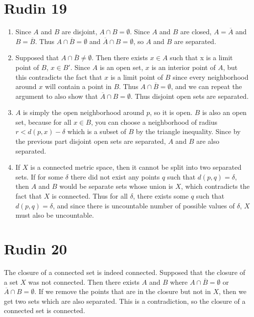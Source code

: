 \documentclass{article}
\begin{document}
\newpage

\section*{Rudin 19}
\begin{enumerate}
	\item Since $A$ and $B$ are disjoint, $A \cap B = \emptyset$.
	Since $A$ and $B$ are closed, $A = \overline{A}$ and $B = \overline{B}$.
	Thus $A \cap \overline{B} = \emptyset$ and $\overline{A} \cap B = \emptyset$,
	so $A$ and $B$ are separated.
	\item Supposed that $A \cap \overline{B} \neq \emptyset$.
	Then there exists $x \in A$ such that x is a limit point of $B$, $x \in B'$.
	Since $A$ is an open set, $x$ is an interior point of $A$,
	but this contradicts the fact that $x$ is a limit point of $B$
	since every neighborhood around $x$ will contain a point in $B$.
	Thus $A \cap \overline{B} = \emptyset$, and we can repeat
	the argument to also show that $\overline{A} \cap B = \emptyset$.
	Thus disjoint open sets are separated.
	\item $A$ is simply the open neighborhood around $p$, so it is open.
	$B$ is also an open set, because for all $x \in B$, you can choose 
	a neighborhood of radius $r < d(p,x) - \delta$ which is a subset of $B$
	by the triangle inequality.
	Since by the previous part disjoint open sets are separated,
	$A$ and $B$ are also separated.
	\item If $X$ is a connected metric space, then it cannot be split
	into two separated sets.
	If for some $\delta$ there did not exist any points $q$ such that 
	$d(p,q) = \delta$, then $A$ and $B$ would be separate sets whose union is $X$,
	which contradicts the fact that $X$ is connected.
	Thus for all $\delta$, there exists some $q$ such that $d(p,q) = \delta$,
	and since there is uncountable number of possible values of $\delta$,
	$X$ must also be uncountable.
\end{enumerate}
\newpage 

\section*{Rudin 20}
The closure of a connected set is indeed connected.
Supposed that the closure of a set $X$ was not connected.
Then there exists $A$ and $B$ where $A \cap \overline{B} = \emptyset$ or $\overline{A} \cap B = \emptyset$.
If we remove the points that are in the closure but not in $X$,
then we get two sets which are also separated.
This is a contradiction, so the closure of a connected set is connected.
\end{document}
